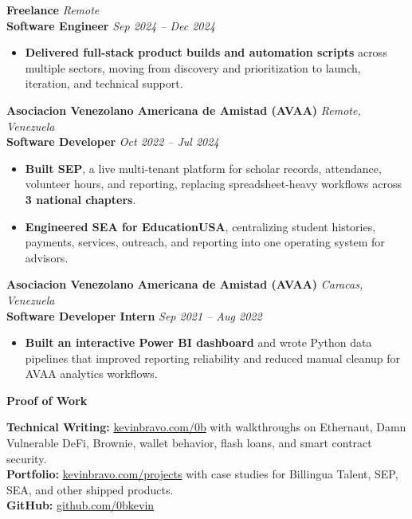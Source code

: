 \documentclass[11pt]{article}
\begin{document}
\vspace{10pt}
\textbf{Freelance} \hfill \textit{Remote} \\
\textbf{Software Engineer} \hfill \textit{Sep 2024 -- Dec 2024}
\begin{itemize}
    \item \textbf{Delivered full-stack product builds and automation scripts} across multiple sectors, moving from discovery and prioritization to launch, iteration, and technical support.
\end{itemize}

\vspace{10pt}
\textbf{Asociacion Venezolano Americana de Amistad (AVAA)} \hfill \textit{Remote, Venezuela} \\
\textbf{Software Developer} \hfill \textit{Oct 2022 -- Jul 2024}
\begin{itemize}
    \item \textbf{Built SEP}, a live multi-tenant platform for scholar records, attendance, volunteer hours, and reporting, replacing spreadsheet-heavy workflows across \textbf{3 national chapters}.
    \item \textbf{Engineered SEA for EducationUSA}, centralizing student histories, payments, services, outreach, and reporting into one operating system for advisors.
\end{itemize}

\vspace{10pt}
\textbf{Asociacion Venezolano Americana de Amistad (AVAA)} \hfill \textit{Caracas, Venezuela} \\
\textbf{Software Developer Intern} \hfill \textit{Sep 2021 -- Aug 2022}
\begin{itemize}
    \item \textbf{Built an interactive Power BI dashboard} and wrote Python data pipelines that improved reporting reliability and reduced manual cleanup for AVAA analytics workflows.
\end{itemize}

\vspace{8pt}
\begin{center}
    \textbf{Proof of Work}
\end{center}
\vspace{-4pt}
\textbf{Technical Writing:} \href{https://kevinbravo.com/0b}{kevinbravo.com/0b} with walkthroughs on Ethernaut, Damn Vulnerable DeFi, Brownie, wallet behavior, flash loans, and smart contract security. \\
\textbf{Portfolio:} \href{https://kevinbravo.com/projects}{kevinbravo.com/projects} with case studies for Billingua Talent, SEP, SEA, and other shipped products. \\
\textbf{GitHub:} \href{https://github.com/0bkevin}{github.com/0bkevin}
\end{document}
